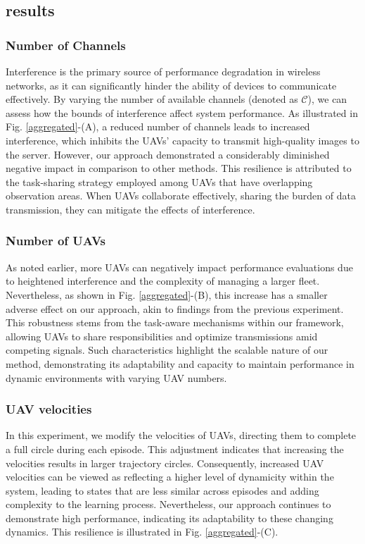 \documentclass[conference]{IEEEtran}
\begin{document}
\subsection{results}
\subsubsection{Number of Channels}
Interference is the primary source of performance degradation in wireless networks, as it can significantly hinder the ability of devices to communicate effectively. By varying the number of available channels (denoted as \(\mathcal{C}\)), we can assess how the bounds of interference affect system performance. As illustrated in Fig. \ref{aggregated}-(A), a reduced number of channels leads to increased interference, which inhibits the UAVs' capacity to transmit high-quality images to the server. However, our approach demonstrated a considerably diminished negative impact in comparison to other methods. This resilience is attributed to the task-sharing strategy employed among UAVs that have overlapping observation areas. When UAVs collaborate effectively, sharing the burden of data transmission, they can mitigate the effects of interference.

\subsubsection{Number of UAVs}
As noted earlier, more UAVs can negatively impact performance evaluations due to heightened interference and the complexity of managing a larger fleet. Nevertheless, as shown in Fig. \ref{aggregated}-(B), this increase has a smaller adverse effect on our approach, akin to findings from the previous experiment. This robustness stems from the task-aware mechanisms within our framework, allowing UAVs to share responsibilities and optimize transmissions amid competing signals. Such characteristics highlight the scalable nature of our method, demonstrating its adaptability and capacity to maintain performance in dynamic environments with varying UAV numbers.

\subsubsection{UAV velocities}
In this experiment, we modify the velocities of UAVs, directing them to complete a full circle during each episode. This adjustment indicates that increasing the velocities results in larger trajectory circles. Consequently, increased UAV velocities can be viewed as reflecting a higher level of dynamicity within the system, leading to states that are less similar across episodes and adding complexity to the learning process. Nevertheless, our approach continues to demonstrate high performance, indicating its adaptability to these changing dynamics. This resilience is illustrated in Fig. \ref{aggregated}-(C).
\end{document}
